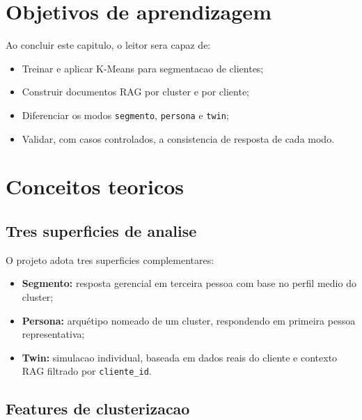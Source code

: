 \section{Objetivos de aprendizagem}

Ao concluir este capitulo, o leitor sera capaz de:

\begin{itemize}[leftmargin=*]
  \item Treinar e aplicar K-Means para segmentacao de clientes;
  \item Construir documentos RAG por cluster e por cliente;
  \item Diferenciar os modos \texttt{segmento}, \texttt{persona} e \texttt{twin};
  \item Validar, com casos controlados, a consistencia de resposta de cada modo.
\end{itemize}

\section{Conceitos teoricos}

\subsection{Tres superficies de analise}

O projeto adota tres superficies complementares:

\begin{itemize}[leftmargin=*]
  \item \textbf{Segmento:} resposta gerencial em terceira pessoa com base
        no perfil medio do cluster;
  \item \textbf{Persona:} arqu\'etipo nomeado de um cluster, respondendo em
        primeira pessoa representativa;
  \item \textbf{Twin:} simulacao individual, baseada em dados reais do
        cliente e contexto RAG filtrado por \texttt{cliente\_id}.
\end{itemize}

\subsection{Features de clusterizacao}

